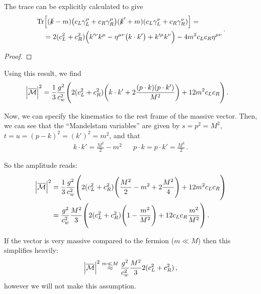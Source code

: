 \documentclass[main.tex]{subfiles}
\begin{document}
\begin{claim}
The trace can be explicitly calculated to give 
%
\begin{align}
\begin{split}
&\Tr[(\slashed{k} - m)\qty(c_L \gamma^{\mu }_{L} + c_R \gamma^{\mu }_{R})
(\slashed{k}' + m)\qty(c_L \gamma^{\nu }_{L} + c_R \gamma^{\nu }_{R})] = \\
&\phantom{=}\ = 2 (c_L^2 + c_R^2) \qty(k^{\prime \nu } k^{\mu } - \eta^{\mu \nu } \qty(k \cdot k') + k^{\prime \mu } k^{\nu })
- 4 m^2 c_L c_R \eta^{\mu \nu }
\end{split}
\,.
\end{align}
\end{claim}

\begin{proof}
\end{proof}

Using this result, we find 
%
\begin{align}
\abs{\mathcal{\overline{M}}}^2 &= 
\frac{1}{3} \frac{g^2}{c_w^2} \qty(2 (c_L^2 + c_R^2)
\qty(k \cdot k' + 2 \frac{(p \cdot k) (p \cdot k')}{M^2}) 
+ 12 m^2 c_L c_R
)
\,.
\end{align}

Now, we can specify the kinematics to the rest frame of the massive vector. Then, we can see that the ``Mandelstam variables'' are given by \(s = p^2 = M^2\), \(t = u = (p-k)^2 = (k')^2 = m^2\), and that 
%
\begin{align}
k \cdot k' = \frac{M^2}{2} - m^2
&&
p \cdot k = p \cdot k' = \frac{M^2}{2}
\,.
\end{align}

So the amplitude reads: 
%
\begin{align}
\abs{\mathcal{\overline{M}}}^2 &= 
\frac{1}{3} \frac{g^2}{c_w^2} \qty(2 (c_L^2 + c_R^2)
\qty( \frac{M^2}{2} - m^2 + 2 \frac{M^2}{4}) + 12 m^2 c_L c_R )  \\
&= \frac{g^2}{c_w^2} \frac{M^2}{3} 
\qty(2 (c_L^2 + c_R^2) \qty(1 - \frac{m^2}{M^2}) + 12 c_L c_R \frac{m^2}{M^2})
\,.
\end{align}

If the vector is very massive compared to the fermion (\(m \ll M\)) then this simplifies heavily: 
%
\begin{align}
\abs{\mathcal{\overline{M}}}^2
\overset{m \ll M}{\approx}
\frac{g^2}{c_w^2} \frac{M^2}{3} 2 (c_L^2 + c_R^2)
\,,
\end{align}
%
however we will not make this assumption.
\end{document}
